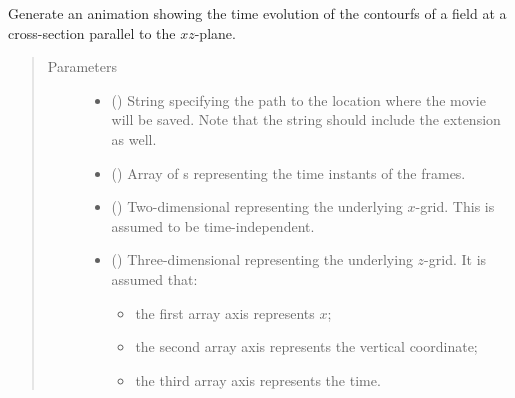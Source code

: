 \documentclass[letterpaper,10pt,english]{sphinxmanual}
\begin{document}
\begin{fulllineitems}
\label{\detokenize{api:tasmania.utils.utils_plot.animation_contourf_xz}}
Generate an animation showing the time evolution of the contourfs of a field at a cross-section
parallel to the \(xz\)-plane.
\begin{quote}\begin{description}
\item[{Parameters}] \leavevmode\begin{itemize}
\item {} 
 () \textendash{} String specifying the path to the location where the movie will be saved.
Note that the string should include the extension as well.

\item {} 
 () \textendash{} Array of s representing the time instants of the frames.

\item {} 
 () \textendash{} Two-dimensional  representing the underlying \(x\)-grid.
This is assumed to be time-independent.

\item {} 
 () \textendash{} 
Three-dimensional  representing the underlying \(z\)-grid.
It is assumed that:
\begin{itemize}
\item {} 
the first array axis represents \(x\);

\item {} 
the second array axis represents the vertical coordinate;

\item {} 
the third array axis represents the time.

\end{itemize}



\end{itemize}
\end{description}
\end{quote}
\end{fulllineitems}
\end{document}

